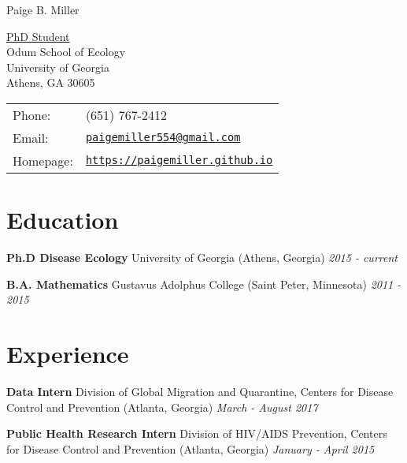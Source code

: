 \documentclass[letterpaper]{article}
\def\name{Paige B. Miller}
\renewenvironment{itemize}{
  \begin{list}{}{
    \setlength{\leftmargin}{1.5em}
  }
}{
  \end{list}
}
\begin{document}
{\huge \name}


\vspace{0.25in}

\begin{minipage}{0.45\linewidth}
  \href{}{PhD Student} \\
  Odum School of Ecology \\
  University of Georgia \\
  Athens, GA 30605
\end{minipage}
\begin{minipage}{0.45\linewidth}
  \begin{tabular}{ll}
    Phone: & (651) 767-2412 \\
    Email: & \href{mailto:paige.miller@uga.edu}{\tt paigemiller554@gmail.com} \\
    Homepage: & \href{https://paigemiller.github.io}{\tt https://paigemiller.github.io} \\
  \end{tabular}
\end{minipage}

\section*{Education}

\begin{itemize}
  \item \textbf{Ph.D Disease Ecology} University of Georgia (Athens, Georgia) 	\hspace{2cm}  \textit{2015 - current}
  \item \textbf{B.A. Mathematics} Gustavus Adolphus College (Saint Peter, Minnesota) \hspace{.7 cm}  \textit{2011 - 2015}
\end{itemize}

\section*{Experience}

\begin{itemize}
  \item  \textbf{Data Intern} Division of Global Migration and Quarantine, Centers for Disease Control and Prevention (Atlanta, Georgia)
   \hspace{9.1 cm}  \textit{March - August 2017}
  \item  \textbf{Public Health Research Intern} Division of HIV/AIDS Prevention, Centers for Disease Control and Prevention (Atlanta, Georgia)
  \hspace{7.3 cm}  \textit{January - April 2015}
\end{itemize}
\end{document}
